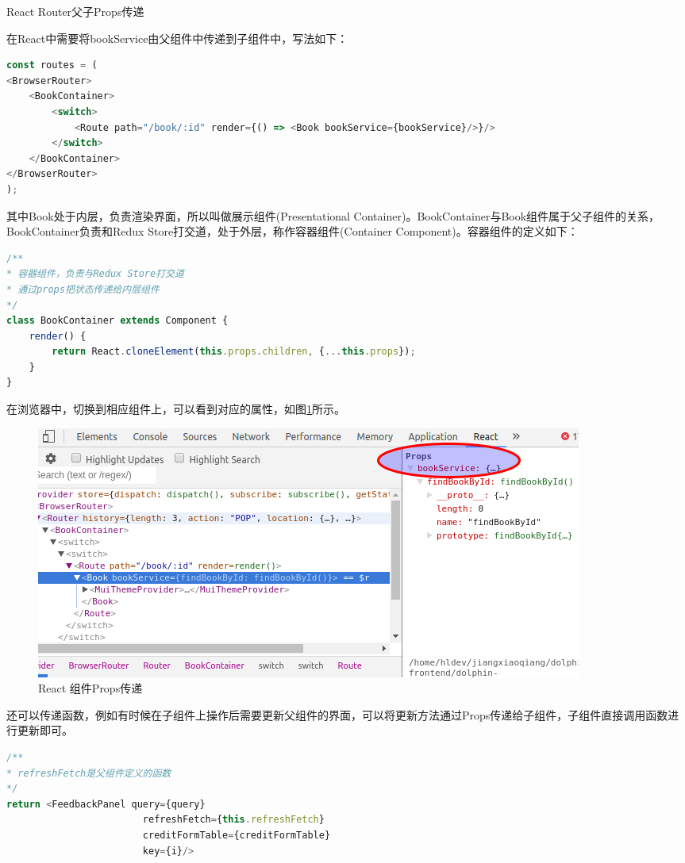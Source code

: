 \documentclass[12pt]{book}
\makeatletter
\numberwithin{dummy}{section}
\theoremstyle{ocrenumbox}
\theoremstyle{blacknumex}
\theoremstyle{blacknumbox}
\theoremstyle{ocrenum}
\renewcommand\paragraph{\@startsection{paragraph}{4}{\z@}
	{-2ex \@plus-.2ex \@minus .2ex}
	{.1ex}
	{\normalfont\small\sffamily\bfseries}}
\makeatother
\begin{document}
\paragraph{React Router父子Props传递}

在React中需要将bookService由父组件中传递到子组件中，写法如下：

\begin{lstlisting}[language=Javascript]
const routes = (
<BrowserRouter>
	<BookContainer>
		<switch>
			<Route path="/book/:id" render={() => <Book bookService={bookService}/>}/>
		</switch>
	</BookContainer>
</BrowserRouter>
);
\end{lstlisting}

其中Book处于内层，负责渲染界面，所以叫做展示组件(Presentational Container)。BookContainer与Book组件属于父子组件的关系，BookContainer负责和Redux Store打交道，处于外层，称作容器组件(Container Component)。容器组件的定义如下：

\begin{lstlisting}[language=Javascript]
/**
* 容器组件，负责与Redux Store打交道
* 通过props把状态传递给内层组件
*/
class BookContainer extends Component {
	render() {
		return React.cloneElement(this.props.children, {...this.props});
	}
}
\end{lstlisting}

在浏览器中，切换到相应组件上，可以看到对应的属性，如图\ref{fig:bookserviceprops}所示。

\begin{figure}[htbp]
	\centering
	\includegraphics[scale=0.5]{bookserviceprops.png}
	\caption{React 组件Props传递}
	\label{fig:bookserviceprops}
\end{figure}

还可以传递函数，例如有时候在子组件上操作后需要更新父组件的界面，可以将更新方法通过Props传递给子组件，子组件直接调用函数进行更新即可。

\begin{lstlisting}[language=Javascript]
/**
* refreshFetch是父组件定义的函数
*/
return <FeedbackPanel query={query}
						refreshFetch={this.refreshFetch}
						creditFormTable={creditFormTable}
						key={i}/>
\end{lstlisting}
\end{document}
